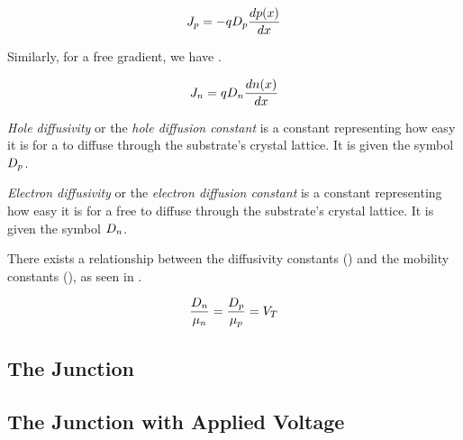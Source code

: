 \begin{equation}\label{eq:Diffusion_Current_Density-Hole}
  J_{p} = - q D_{p} \frac{d p(x)}{dx}
\end{equation}

Similarly, for a free  gradient, we have .

\begin{equation}\label{eq:Diffusion_Current_Density-Electron}
  J_{n} = q D_{n} \frac{d n(x)}{dx}
\end{equation}

\begin{definition}\label{def:Hole_Diffusivity}
  \emph{Hole diffusivity} or the \emph{hole diffusion constant} is a constant representing how easy it is for a  to diffuse through the substrate's crystal lattice.
  It is given the symbol $D_{p}$.
\end{definition}

\begin{definition}\label{def:Electron_Diffusivity}
  \emph{Electron diffusivity} or the \emph{electron diffusion constant} is a constant representing how easy it is for a free  to diffuse through the substrate's crystal lattice.
  It is given the symbol $D_{n}$.
\end{definition}

There exists a relationship between the diffusivity constants () and the mobility constants (), as seen in .

\begin{equation}\label{eq:Diffusivity_Mobility_Constants_Relation}
  \frac{D_{n}}{\mu_{n}} = \frac{D_{p}}{\mu_{p}} = V_{T}
\end{equation}

\subsection{The \PNJunction{} Junction}\label{subsec:The_pn_Junction}

\subsection{The \PNJunction{} Junction with Applied Voltage}\label{subsec:The_pn_Junction-Voltage_Applied}


